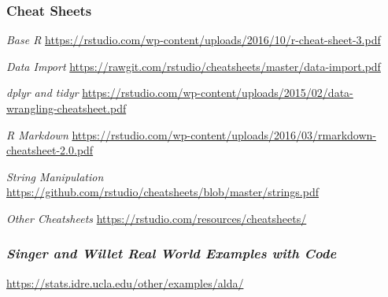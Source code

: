 \documentclass[
]{article}
\begin{document}
\hypertarget{cheat-sheets}{%
\subsubsection{\texorpdfstring{\textbf{Cheat
Sheets}}{Cheat Sheets}}\label{cheat-sheets}}

\emph{Base R}
\url{https://rstudio.com/wp-content/uploads/2016/10/r-cheat-sheet-3.pdf}

\emph{Data Import}
\url{https://rawgit.com/rstudio/cheatsheets/master/data-import.pdf}

\emph{dplyr and tidyr}
\url{https://rstudio.com/wp-content/uploads/2015/02/data-wrangling-cheatsheet.pdf}

\emph{R Markdown}
\url{https://rstudio.com/wp-content/uploads/2016/03/rmarkdown-cheatsheet-2.0.pdf}

\emph{String Manipulation}
\url{https://github.com/rstudio/cheatsheets/blob/master/strings.pdf}

\emph{Other Cheatsheets}
\url{https://rstudio.com/resources/cheatsheets/}

\hypertarget{singer-and-willet-real-world-examples-with-code}{%
\subsubsection{\texorpdfstring{\emph{Singer and Willet Real World
Examples with Code}
}{Singer and Willet Real World Examples with Code  }}\label{singer-and-willet-real-world-examples-with-code}}

\url{https://stats.idre.ucla.edu/other/examples/alda/}
\end{document}
